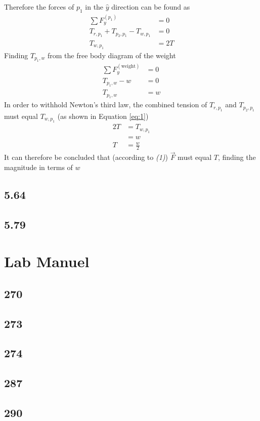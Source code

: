 \documentclass{article}
\begin{document}
Therefore the forces of $ p_1 $ in the $ \hat{y} $ direction can be found as
\begin{align*}
	\sum F_y^{(p_1)} & = 0 \\
	T_{r,p_1} + T_{p_2,p_1} - T_{w,p_1} & = 0 \\
	T_{w,p_1} & = 2T
\end{align*}
Finding $ T_{p_1,w} $ from the free body diagram of the weight
\begin{align*}
	\sum F_y^{(\text{weight})} & = 0 \\
	T_{p_1,w} - w & = 0 \\
	T_{p_1,w} & = w
\end{align*}
In order to withhold Newton's third law, the combined tension of $ T_{r,p_1} $ and $ T_{p_2,p_1} $ must equal $ T_{w,p_1} $ (as shown in Equation \ref{eq:1})
\begin{align*}
	2T & = T_{w,p_1} \\
	   & = w \\
	T & = \frac{w}{2}
\end{align*}
It can therefore be concluded that (according to \textit{(1)}) $ \vec{F} $ must equal $ T $, finding the magnitude in terms of $ w $

\subsection{5.64}

\subsection{5.79}

\section{Lab Manuel}

\subsection{270}

\subsection{273}

\subsection{274}

\subsection{287}

\subsection{290}
\end{document}
